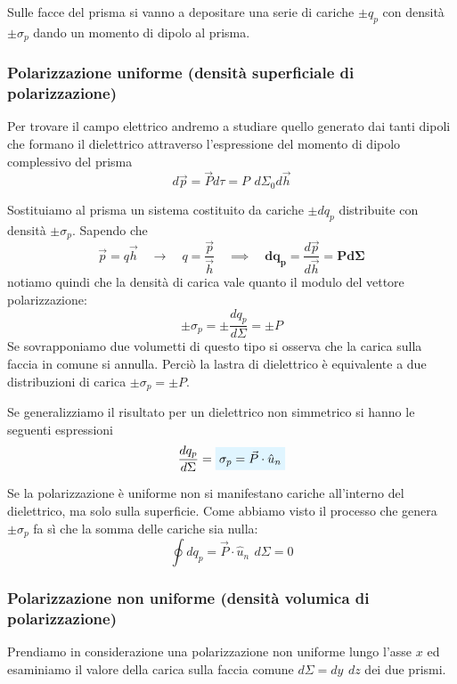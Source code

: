 \documentclass[x11names]{report}
\begin{document}
Sulle facce del prisma si vanno a depositare una serie di cariche \(\pm q_p\) con densità \(\pm \sigma_p\) dando un momento di dipolo al prisma.

\subsubsection{Polarizzazione uniforme (densità superficiale di polarizzazione)}
Per trovare il campo elettrico andremo a studiare quello generato dai tanti dipoli che formano il dielettrico attraverso l'espressione del momento di dipolo complessivo del prisma
\[
d\vec{p} = \vec{P}d\tau = P \,\ d\Sigma_0 d\vec{h}
\]

\begin{figure}[H]
	\centering
\end{figure}

Sostituiamo al prisma un sistema costituito da cariche \(\pm dq_p\) distribuite con densità \(\pm\sigma_p\). Sapendo che 
\[
\vec{p} = q \vec{h} \quad \to \quad q = \frac{\vec{p}}{\vec{h}} \quad \implies \quad \boldsymbol{dq_p =} \frac{d\vec{p}}{d\vec{h}} \boldsymbol{= Pd\Sigma}
\]
notiamo quindi che la densità di carica vale quanto il modulo del vettore polarizzazione:
\[
\pm\sigma_p = \pm\frac{dq_p}{d\Sigma} =\pm P
\]
Se sovrapponiamo due volumetti di questo tipo si osserva che la carica sulla faccia in comune si annulla. Perciò la lastra di dielettrico è equivalente a due distribuzioni di carica \(\pm \sigma_p = \pm P\).

Se generalizziamo il risultato per un dielettrico non simmetrico si hanno le seguenti espressioni 
\begin{equation}
	\frac{dq_p}{d\Sigma} = \viola{\sigma_p = \vec{P} \cdot \hat{u}_n  }
\end{equation}



Se la polarizzazione è uniforme non si manifestano cariche all'interno del dielettrico, ma solo sulla superficie. Come abbiamo visto il processo che genera \(\pm \sigma_p\) fa sì che la somma delle cariche sia nulla:
\[
\oint dq_p =  \vec{P} \cdot \hat{u}_n \,\ d\Sigma = 0
\]

\subsubsection{Polarizzazione non uniforme (densità volumica di polarizzazione)}
Prendiamo in considerazione una polarizzazione non uniforme lungo l'asse \(x\)  ed esaminiamo il valore della carica sulla faccia comune \(d\Sigma = dy \,\ dz \) dei due prismi.
\end{document}
